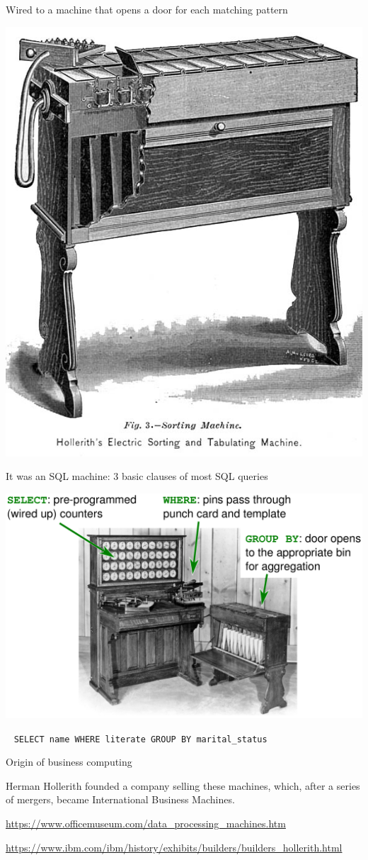 \documentclass[aspectratio=169]{beamer}
\begin{document}
\begin{frame}{Wired to a machine that opens a door for each matching pattern}
\vspace{0.25 cm}
\begin{center}
\includegraphics[width=0.45\linewidth]{1890_Hollerith_Sorting_Machine_OM.jpg}
\end{center}
\end{frame}

\begin{frame}{It was an SQL machine: 3 basic clauses of most SQL queries}
\vspace{0.25 cm}
\begin{center}
\includegraphics[width=0.75\linewidth]{hh-tabulator.pdf}
\end{center}

\mbox{ } \hfill \texttt{SELECT name WHERE literate GROUP BY marital_status} \hfill \mbox{ }
\end{frame}

\begin{frame}{Origin of business computing}
\Large
\vspace{0.5 cm}
\begin{center}
Herman Hollerith founded a company selling these machines, which, after a series of mergers, became International Business Machines.
\end{center}

\small
\vspace{1 cm}
\textcolor{blue}{\url{https://www.officemuseum.com/data_processing_machines.htm}}

\vspace{0.25 cm}
\textcolor{blue}{\url{https://www.ibm.com/ibm/history/exhibits/builders/builders_hollerith.html}}
\end{frame}
\end{document}
